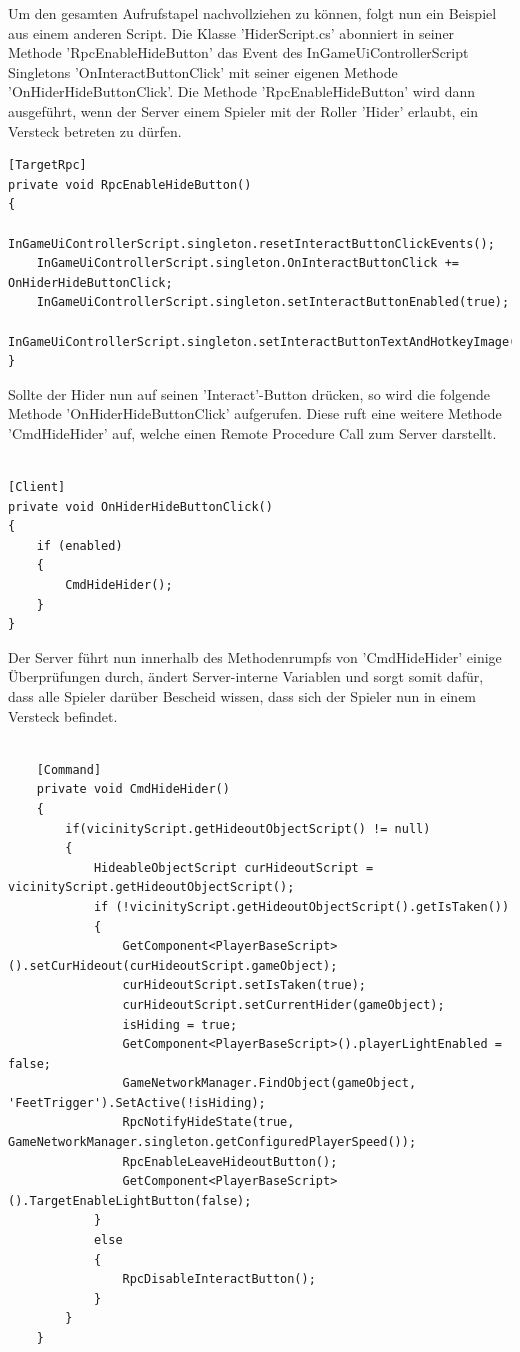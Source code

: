 Um den gesamten Aufrufstapel nachvollziehen zu können, folgt nun ein Beispiel aus einem anderen Script.
Die Klasse 'HiderScript.cs' abonniert in seiner Methode 'RpcEnableHideButton' das Event des InGameUiControllerScript Singletons 'OnInteractButtonClick' mit seiner eigenen Methode 'OnHiderHideButtonClick'. Die Methode 'RpcEnableHideButton' wird dann ausgeführt, wenn der Server einem Spieler mit der Roller 'Hider' erlaubt, ein Versteck betreten zu dürfen.

\begin{lstlisting}[caption= HiderScript.cs Subscribe to InGameUiControllerScript Event]
[TargetRpc]
private void RpcEnableHideButton()
{
	InGameUiControllerScript.singleton.resetInteractButtonClickEvents();
	InGameUiControllerScript.singleton.OnInteractButtonClick += OnHiderHideButtonClick;
	InGameUiControllerScript.singleton.setInteractButtonEnabled(true);
	InGameUiControllerScript.singleton.setInteractButtonTextAndHotkeyImage('Hide');
}
\end{lstlisting}

Sollte der Hider nun auf seinen 'Interact'-Button drücken, so wird die folgende Methode 'OnHiderHideButtonClick' aufgerufen. Diese ruft eine weitere Methode 'CmdHideHider' auf, welche einen Remote Procedure Call\cite{.05.02.2022} zum Server darstellt.

\begin{lstlisting}[caption= HiderScript.csOnHiderHideButtonClick() Method]

[Client]
private void OnHiderHideButtonClick()
{
	if (enabled)
	{
		CmdHideHider();
	}
}

\end{lstlisting}

Der Server führt nun innerhalb des Methodenrumpfs von 'CmdHideHider' einige Überprüfungen durch, ändert Server-interne Variablen und sorgt somit dafür, dass alle Spieler darüber Bescheid wissen, dass sich der Spieler nun in einem Versteck befindet.

\begin{lstlisting}[caption= HiderScript.cs Subscribe to InGameUiControllerScript Event]
	
	[Command]
	private void CmdHideHider()
	{
		if(vicinityScript.getHideoutObjectScript() != null)
		{
			HideableObjectScript curHideoutScript = vicinityScript.getHideoutObjectScript();
			if (!vicinityScript.getHideoutObjectScript().getIsTaken())
			{
				GetComponent<PlayerBaseScript>().setCurHideout(curHideoutScript.gameObject);
				curHideoutScript.setIsTaken(true);
				curHideoutScript.setCurrentHider(gameObject);
				isHiding = true;
				GetComponent<PlayerBaseScript>().playerLightEnabled = false;
				GameNetworkManager.FindObject(gameObject, 'FeetTrigger').SetActive(!isHiding);
				RpcNotifyHideState(true, GameNetworkManager.singleton.getConfiguredPlayerSpeed());
				RpcEnableLeaveHideoutButton();
				GetComponent<PlayerBaseScript>().TargetEnableLightButton(false);
			}
			else
			{
				RpcDisableInteractButton();
			}
		}
	}	
\end{lstlisting}


